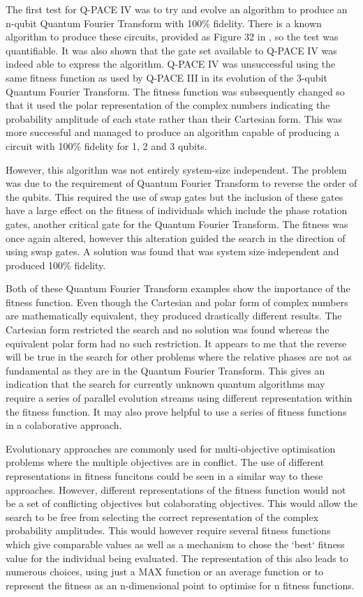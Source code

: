The first test for Q-PACE IV was to try and evolve an algorithm to produce an n-qubit Quantum Fourier Transform with 100\% fidelity.
There is a known algorithm to produce these circuits, provided as Figure 32 in \cite{masseythesis}, so the test was quantifiable.
It was also shown that the gate set available to Q-PACE IV was indeed able to express the algorithm.
Q-PACE IV was unsuccessful using the same fitness function as used by Q-PACE III in its evolution of the 3-qubit Quantum Fourier Transform.
The fitness function was subsequently changed so that it used the polar representation of the complex numbers indicating the probability amplitude of each state rather than their Cartesian form.
This was more successful and managed to produce an algorithm capable of producing a circuit with 100\% fidelity for 1, 2 and 3 qubits.

However, this algorithm was not entirely system-size independent.
The problem was due to the requirement of Quantum Fourier Transform to reverse the order of the qubits.
This required the use of swap gates but the inclusion of these gates have a large effect on the fitness of individuals which include the phase rotation gates, another critical gate for the Quantum Fourier Transform.
The fitness was once again altered, however this alteration guided the search in the direction of using swap gates.
A solution was found that was system size independent and produced 100\% fidelity.

Both of these Quantum Fourier Transform examples show the importance of the fitness function.
Even though the Cartesian and polar form of complex numbers are mathematically equivalent, they produced drastically different results.
The Cartesian form restricted the search and no solution was found whereas the equivalent polar form had no such restriction.
It appears to me that the reverse will be true in the search for other problems where the relative phases are not as fundamental as they are in the Quantum Fourier Transform.
This gives an indication that the search for currently unknown quantum algorithms may require a series of parallel evolution streams using different representation within the fitness function.
It may also prove helpful to use a series of fitness functions in a colaborative approach.

Evolutionary approaches are commonly used for multi-objective optimisation problems where the multiple objectives are in conflict.
The use of different representations in fitness funcitons could be seen in a similar way to these approaches.
However, different representations of the fitness function would not be a set of conflicting objectives but colaborating objectives.
This would allow the search to be free from selecting the correct representation of the complex probability amplitudes.
This would however require several fitness functions which give comparable values as well as a mechanism to chose the `best` fitness value for the individual being evaluated.
The representation of this also leads to numerous choices, using just a MAX function or an average function or to represent the fitness as an n-dimensional point to optimise for n fitness functions.

